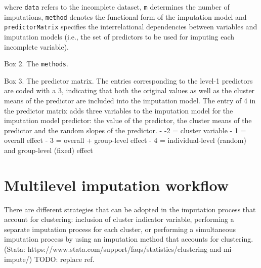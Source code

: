 \documentclass[
  article]{jss}
\begin{document}
where \texttt{data} refers to the incomplete dataset, \texttt{m}
determines the number of imputations, \texttt{method} denotes the
functional form of the imputation model and \texttt{predictorMatrix}
specifies the interrelational dependencies between variables and
imputation models (i.e., the set of predictors to be used for imputing
each incomplete variable).

\begin{tcolorbox}[enhanced jigsaw, breakable, toprule=.15mm, arc=.35mm, bottomrule=.15mm, leftrule=.75mm, colframe=quarto-callout-color-frame, opacityback=0, colback=white, rightrule=.15mm, left=2mm]

Box 2. The \texttt{methods}.

\end{tcolorbox}

\begin{tcolorbox}[enhanced jigsaw, breakable, toprule=.15mm, arc=.35mm, bottomrule=.15mm, leftrule=.75mm, colframe=quarto-callout-color-frame, opacityback=0, colback=white, rightrule=.15mm, left=2mm]

Box 3. The predictor matrix. The entries corresponding to the level-1
predictors are coded with a 3, indicating that both the original values
as well as the cluster means of the predictor are included into the
imputation model. The entry of 4 in the predictor matrix adds three
variables to the imputation model for the imputation model predictor:
the value of the predictor, the cluster means of the predictor and the
random slopes of the predictor. - -2 = cluster variable - 1 = overall
effect - 3 = overall + group-level effect - 4 = individual-level
(random) and group-level (fixed) effect

\end{tcolorbox}

\hypertarget{sec-workflow}{%
\section{Multilevel imputation workflow}\label{sec-workflow}}

There are different strategies that can be adopted in the imputation
process that account for clustering: inclusion of cluster indicator
variable, performing a separate imputation process for each cluster, or
performing a simultaneous imputation process by using an imputation
method that accounts for clustering.(Stata:
https://www.stata.com/support/faqs/statistics/clustering-and-mi-impute/)
TODO: replace ref.
\end{document}
